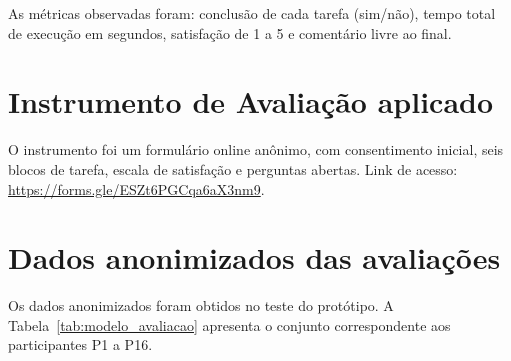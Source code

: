 \documentclass[12pt, oneside, a4paper, chapter=TITLE,section=TITLE]{abntex2}
\begin{document}
As métricas observadas foram: conclusão de cada tarefa (sim/não), tempo total de execução em segundos, satisfação de 1 a 5 e comentário livre ao final.

\section{Instrumento de Avaliação aplicado}

O instrumento foi um formulário online anônimo, com consentimento inicial, seis blocos de tarefa, escala de satisfação e perguntas abertas. Link de acesso: \url{https://forms.gle/ESZt6PGCqa6aX3nm9}.

\section{Dados anonimizados das avaliações}

Os dados anonimizados foram obtidos no teste do protótipo. A Tabela~\ref{tab:modelo_avaliacao} apresenta o conjunto correspondente aos participantes P1 a P16.
\end{document}
